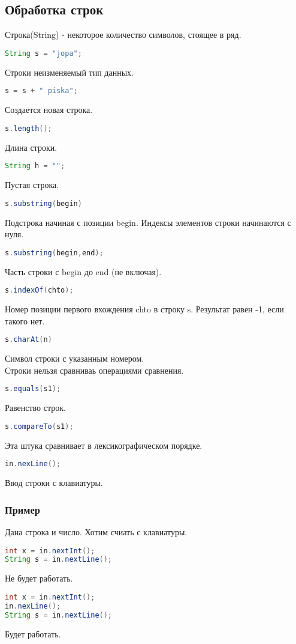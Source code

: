 \documentclass{scrartcl}
\begin{document}
\subsection{Обработка строк}
Строка(String) - некоторое количество символов, стоящее в ряд.
\begin{lstlisting}[language=Java] 
String s = "jopa";
\end{lstlisting} 
Строки неизменяемый тип данных.
\begin{lstlisting}[language=Java] 
s = s + " piska";
\end{lstlisting} 
Создается новая строка.
\begin{lstlisting}[language=Java] 
s.length();
\end{lstlisting} 
Длина строки.
\begin{lstlisting}[language=Java] 
String h = "";
\end{lstlisting} 
Пустая строка.
\begin{lstlisting}[language=Java] 
s.substring(begin) 
\end{lstlisting} 
Подстрока начиная с позиции begin. Индексы элементов строки начинаются с нуля.
\begin{lstlisting}[language=Java] 
s.substring(begin,end);
\end{lstlisting} 
Часть строки с begin до end (не включая).
\begin{lstlisting}[language=Java] 
s.indexOf(chto);
\end{lstlisting} 
Номер позиции первого вхождения chto в строку s. Результат равен -1, если такого нет.
\begin{lstlisting}[language=Java] 
s.charAt(n) 
\end{lstlisting} 
Символ строки с указанным номером.\\
Строки нельзя сравниваь операциями сравнения.
\begin{lstlisting}[language=Java] 
s.equals(s1);
\end{lstlisting} 
Равенство строк.
\begin{lstlisting}[language=Java] 
s.compareTo(s1);
\end{lstlisting} 
Эта штука сравнивает в лексикографическом порядке.
\begin{lstlisting}[language=Java] 
in.nexLine();
\end{lstlisting} 
Ввод строки с клавиатуры.
\subsubsection{Пример}
Дана строка и число. Хотим счиать с клавиатуры.
\begin{lstlisting}[language=Java] 
int x = in.nextInt();
String s = in.nextLine();
\end{lstlisting} 
Не будет работать.
\begin{lstlisting}[language=Java] 
int x = in.nextInt();
in.nexLine();
String s = in.nextLine();
\end{lstlisting} 
Будет работать.
\end{document}
